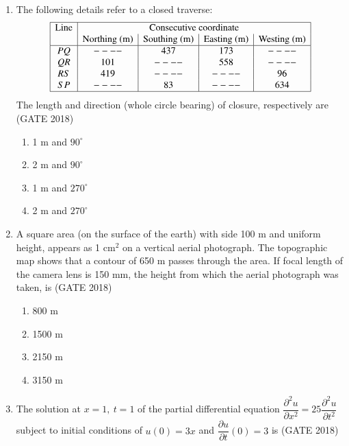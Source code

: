 \documentclass[journal,12pt,onecolumn]{IEEEtran}
\theoremstyle{remark}
\begin{document}
\begin{enumerate}
\newpage
\item The following details refer to a closed traverse:
\[
\begin{array}{|c|c|c|c|c|}
\hline
\text{Line} & \multicolumn{4}{c|}{\text{Consecutive coordinate}}\\
 & \text{Northing (m)} & \text{Southing (m)} & \text{Easting (m)} & \text{Westing (m)} \\
\hline
PQ & ---- & 437 & 173 & ---- \\
QR & 101 & ---- & 558 & ---- \\
RS & 419 & ---- & ---- & 96 \\
SP & ---- & 83 & ---- & 634 \\
\hline
\end{array}
\]
The length and direction (whole circle bearing) of closure, respectively are
\hfill{(GATE 2018)}
\begin{multicols}{4}
\begin{enumerate}
    \item 1 m and $90^\circ$
    \item 2 m and $90^\circ$
    \item 1 m and $270^\circ$
    \item 2 m and $270^\circ$
\end{enumerate}
\end{multicols}
\vspace{1cm}

\item A square area (on the surface of the earth) with side 100 m and uniform height, appears as 1 cm$^2$ on a vertical aerial photograph. The topographic map shows that a contour of 650 m passes through the area. If focal length of the camera lens is 150 mm, the height from which the aerial photograph was taken, is
\hfill{(GATE 2018)}
\begin{multicols}{4}
\begin{enumerate}
    \item 800 m
    \item 1500 m
    \item 2150 m
    \item 3150 m
\end{enumerate}
\end{multicols}
\vspace{1cm}

\item The solution at $x=1,~t=1$ of the partial differential equation $\dfrac{\partial^2 u}{\partial x^2}=25\dfrac{\partial^2 u}{\partial t^2}$ subject to initial conditions of $u(0)=3x$ and $\dfrac{\partial u}{\partial t}(0)=3$ is \underline{\hspace{3cm}}
\hfill{(GATE 2018)}
\vspace{1cm}


\end{enumerate}
\end{document}
